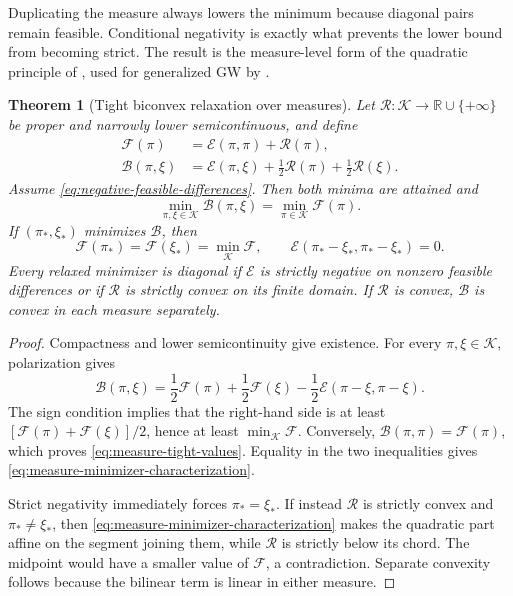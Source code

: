 \documentclass[11pt]{article}
\newtheorem{theorem}{Theorem}[section]
\theoremstyle{definition}
\theoremstyle{remark}
\newcommand{\R}{\mathbb R}
\newcommand{\Kcal}{\mathcal K}
\newcommand{\Ee}{\mathcal E}
\newcommand{\Fcal}{\mathcal F}
\newcommand{\Bcal}{\mathcal B}
\newcommand{\Rcal}{\mathcal R}
\begin{document}
Duplicating the measure always lowers the minimum because diagonal pairs
remain feasible.  Conditional negativity is exactly what prevents the lower
bound from becoming strict.  The result is the measure-level form of the
quadratic principle of \citet{Konno1976}, used for generalized GW by
\citet{SejourneVialardPeyre2021}.

\begin{theorem}[Tight biconvex relaxation over measures]
\label{thm:measure-tightness}
Let \(\Rcal:\Kcal\to\R\cup\{+\infty\}\) be proper and narrowly lower
semicontinuous, and define
\begin{align}
  \Fcal(\pi)
  &=\Ee(\pi,\pi)+\Rcal(\pi),
  \label{eq:general-diagonal-objective}\\
  \Bcal(\pi,\xi)
  &=\Ee(\pi,\xi)
    +\frac12\Rcal(\pi)+\frac12\Rcal(\xi).
  \label{eq:general-biconvex-objective}
\end{align}
Assume \eqref{eq:negative-feasible-differences}.  Then both minima are
attained and
\begin{equation}\label{eq:measure-tight-values}
  \min_{\pi,\xi\in\Kcal}\Bcal(\pi,\xi)
  =
  \min_{\pi\in\Kcal}\Fcal(\pi).
\end{equation}
If \((\pi_*,\xi_*)\) minimizes \(\Bcal\), then
\begin{equation}\label{eq:measure-minimizer-characterization}
  \Fcal(\pi_*)=\Fcal(\xi_*)=\min_{\Kcal}\Fcal,
  \qquad
  \Ee(\pi_*-\xi_*,\pi_*-\xi_*)=0.
\end{equation}
Every relaxed minimizer is diagonal if \(\Ee\) is strictly negative on
nonzero feasible differences or if \(\Rcal\) is strictly convex on its
finite domain.  If \(\Rcal\) is convex, \(\Bcal\) is convex in each measure
separately.
\end{theorem}

\begin{proof}
Compactness and lower semicontinuity give existence.  For every
\(\pi,\xi\in\Kcal\), polarization gives
\begin{equation}\label{eq:measure-polarization-identity}
  \Bcal(\pi,\xi)
  =
  \frac12\Fcal(\pi)+\frac12\Fcal(\xi)
  -\frac12\Ee(\pi-\xi,\pi-\xi).
\end{equation}
The sign condition implies that the right-hand side is at least
\(
 [\Fcal(\pi)+\Fcal(\xi)]/2
\), hence at least \(\min_{\Kcal}\Fcal\).  Conversely,
\(\Bcal(\pi,\pi)=\Fcal(\pi)\), which proves
\eqref{eq:measure-tight-values}.  Equality in the two inequalities gives
\eqref{eq:measure-minimizer-characterization}.

Strict negativity immediately forces \(\pi_*=\xi_*\).  If instead
\(\Rcal\) is strictly convex and \(\pi_*\ne\xi_*\), then
\eqref{eq:measure-minimizer-characterization} makes the quadratic part affine
on the segment joining them, while \(\Rcal\) is strictly below its chord.
The midpoint would have a smaller value of \(\Fcal\), a contradiction.
Separate convexity follows because the bilinear term is linear in either
measure.
\end{proof}
\end{document}

